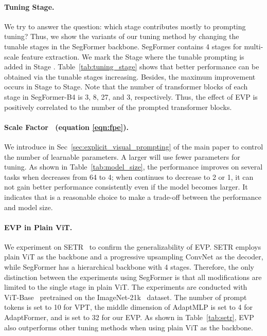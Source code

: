 \paragraph{Tuning Stage.}
We try to answer the question: which stage contributes mostly to prompting tuning? Thus, we show the variants of our tuning method by changing the tunable stages in the SegFormer backbone. SegFormer contains 4 stages for multi-scale feature extraction. We mark the Stage where the tunable prompting is added in Stage . Table~\ref{tab:tuning_stage} shows that better performance can be obtained via the tunable stages increasing. Besides, the maximum improvement occurs in Stage to Stage. Note that the number of transformer blocks of each stage in SegFormer-B4 is 3, 8, 27, and 3, respectively. Thus, the effect of EVP is positively correlated to the number of the prompted transformer blocks.


\paragraph{Scale Factor ~(equation \ref{eqn:fpe}).}
We introduce  in Sec~\ref{sec:explicit_visual_prompting} of the main paper to control the number of learnable parameters. A larger  will use fewer parameters for tuning. As shown in Table~\ref{tab:model_size}, the performance improves on several tasks when  decreases from 64 to 4; when  continues to decrease to 2 or 1, it can not gain better performance consistently even if the model becomes larger. It indicates that  is a reasonable choice to make a trade-off between the performance and model size. 



\paragraph{EVP in Plain ViT.}
We experiment on SETR~\cite{zheng2021rethinking} to confirm the generalizability of EVP. SETR employs plain ViT as the backbone and a progressive upsampling ConvNet as the decoder, while SegFormer has a hierarchical backbone with 4 stages. Therefore, the only distinction between the experiments using SegFormer is that all modifications are limited to the single stage in plain ViT. The experiments are conducted with ViT-Base~\cite{dosovitskiy2020image} pretrained on the ImageNet-21k~\cite{imagenet} dataset. The number of prompt tokens is set to 10 for VPT, the middle dimension of AdaptMLP is set to 4 for AdaptFormer, and  is set to 32 for our EVP. As shown in Table~\ref{tab:setr}, EVP also outperforms other tuning methods when using plain ViT as the backbone.


